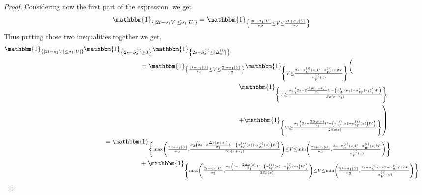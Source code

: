 \documentclass[12pt]{article}
\theoremstyle{Theorem}
\begin{document}
\begin{proof}
Considering now the first part of the expression, we get 
{\small
\begin{align*}
\mathbbm{1}_{\left\{ |2t - \sigma_{2}V| \leq \sigma_{1}|U|\right\}} & =  \mathbbm{1}_{\left\{ \frac{2t - \sigma_{1}|U|}{\sigma_{2}} \leq V \leq \frac{2t + \sigma_{1}|U|}{\sigma_{2}}  \right\}}
\end{align*}}
Thus putting those two inequalities together we get, 
{\tiny
\begin{align*}
\mathbbm{1}_{\left\{ |2t - \sigma_{2}V| \leq \sigma_{1}|U|\right\}}\mathbbm{1}_{\left\{ 2s - S^{\scriptscriptstyle (i)}_{\scriptscriptstyle x} \geq 0 \right\}}\mathbbm{1}_{\left\{ 2s - S^{\scriptscriptstyle (i)}_{\scriptscriptstyle x} \leq |\Delta^{\scriptscriptstyle (i)}_ {\scriptscriptstyle x}|\right\}} \\
& \hspace{-5cm}=  \mathbbm{1}_{\left\{ \frac{2t - \sigma_{1}|U|}{\sigma_{2}} \leq V \leq \frac{2t + \sigma_{1}|U|}{\sigma_{2}}  \right\}}\mathbbm{1}_{\left\{ V \leq \frac{2s -   \pi^{\scriptscriptstyle (i)}_{U}(x)U - \pi^{\scriptscriptstyle (i)}_{W}(x)W}{\pi^{\scriptscriptstyle (i)}_{V}(x)}\right\}} \bigg( \\
& \hspace{0.35cm}  \left. \mathbbm{1}_{\left\{V \geq \frac{\sigma_{2}\left(2s - 2\frac{\Delta\rho(x+e_i)}{\sigma_1}U -  \left(\pi^{1}_{W}(e_1) + \alpha^{1}_{W}(e_1)\right)W\right)}{S\rho(x+e_i)}\right\}} \right. \\
& \hspace{0.35cm} \left. + \mathbbm{1}_{\left\{ V \geq \frac{\sigma_{2}\left(2s -\frac{2\Delta\rho(x)}{\sigma_1}U - \left(\pi^{\scriptscriptstyle (i)}_{W}(x) - \alpha^{\scriptscriptstyle (i)}_{W}(x)\right)W\right)}{2S\rho(x)}\right\}}\right)\\
& \hspace{-7cm}= \mathbbm{1}_{\left\{\max\left(\frac{2t - \sigma_{1}|U|}{\sigma_{2}},\frac{\sigma_{2}\left(2s - 2\frac{\Delta\rho(x+e_i)}{\sigma_1}U -  \left(\pi^{\scriptscriptstyle (i)}_{W}(x) + \alpha^{\scriptscriptstyle (i)}_{W}(x)\right)W\right)}{S\rho(x+e_i)}\right) \leq V \leq \min\left(\frac{2t + \sigma_{1}|U|}{\sigma_{2}}, \frac{2s - \pi^{\scriptscriptstyle (i)}_{U}(x)U - \pi^{\scriptscriptstyle (i)}_{W}(x)W}{\pi^{\scriptscriptstyle (i)}_{V}(x)}\right)\right\}}\\
& \hspace{-5cm} + \mathbbm{1}_{\left\{\max\left(\frac{2t - \sigma_{1}|U|}{\sigma_{2}},\frac{\sigma_{2}\left(2s -\frac{2\Delta\rho(x)}{\sigma_1}U - \left(\pi^{\scriptscriptstyle (i)}_{W}(x) - \alpha^{\scriptscriptstyle (i)}_{W}(x)\right)W\right)}{2S\rho(x)}\right) \leq V \leq \min\left(\frac{2t + \sigma_{1}|U|}{\sigma_{2}}, \frac{2s - \pi^{\scriptscriptstyle (i)}_{U}(x)U - \pi^{\scriptscriptstyle (i)}_{W}(x)W}{\pi^{\scriptscriptstyle (i)}_{V}(x)}\right)\right\}}

\end{align*}}
\end{proof}
\end{document}
